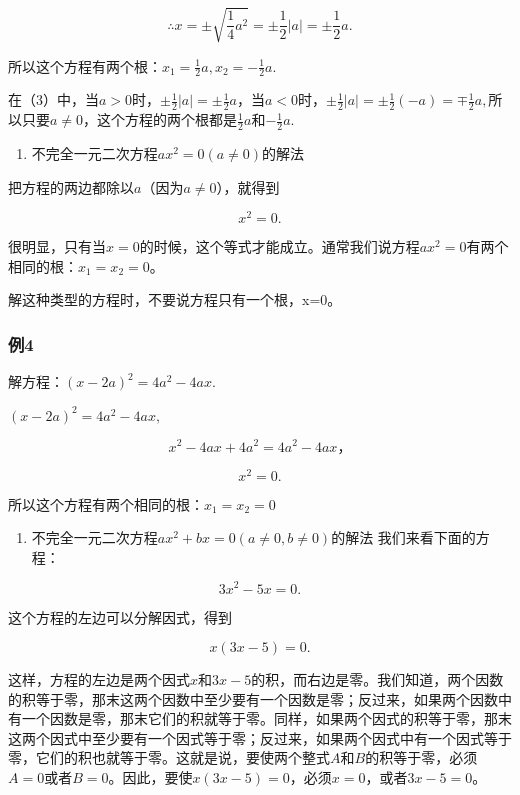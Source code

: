 \[
\therefore x = \pm \sqrt {\frac{1}{4} a ^ {2}} = \pm \frac{1}{2} | a | = \pm \frac{1}{2} a.
\]

所以这个方程有两个根：\(x_{1} = \frac{1}{2} a, x_{2} = -\frac{1}{2} a.\)

在（3）中，当\(a > 0\)时，\(\pm \frac{1}{2} |a| = \pm \frac{1}{2} a\)，当\(a <   0\)时，\(\pm \frac{1}{2} |a| = \pm \frac{1}{2} (-a) = \mp \frac{1}{2} a,\)所以只要\(a\neq 0\)，这个方程的两个根都是\(\frac{1}{2} a\)和\(-\frac{1}{2} a.\)

\begin{enumerate}[start=2]
\item
  不完全一元二次方程\(ax^2 = 0 (a \neq 0)\)的解法
\end{enumerate}

把方程的两边都除以\(a\)（因为\(a \neq 0\)），就得到

\[
x ^ {2} = 0.
\]

很明显，只有当\(x = 0\)的时候，这个等式才能成立。通常我们说方程\(ax^2 = 0\)有两个相同的根：\(x_1 = x_2 = 0\)。

 解这种类型的方程时，不要说方程只有一个根，x=0。

\subsubsection{例4}

解方程：\((x - 2a)^{2} = 4a^{2} - 4ax.\)

 \((x - 2a)^{2} = 4a^{2} - 4ax,\)

\[
x ^ {2} - 4 a x + 4 a ^ {2} = 4 a ^ {2} - 4 a x\text{，}
\]

\[
x ^ {2} = 0.
\]

所以这个方程有两个相同的根：\(x_{1} = x_{2} = 0\)

\begin{enumerate}[start=3]
\item
  不完全一元二次方程\(ax^2 + bx = 0 (a \neq 0, b \neq 0)\)的解法
  我们来看下面的方程：
\end{enumerate}

\[
3 x ^ {2} - 5 x = 0.
\]

这个方程的左边可以分解因式，得到

\[
x (3 x - 5) = 0.
\]

这样，方程的左边是两个因式\(x\)和\(3x - 5\)的积，而右边是零。我们知道，两个因数的积等于零，那末这两个因数中至少要有一个因数是零；反过来，如果两个因数中有一个因数是零，那末它们的积就等于零。同样，如果两个因式的积等于零，那末这两个因式中至少要有一个因式等于零；反过来，如果两个因式中有一个因式等于零，它们的积也就等于零。这就是说，要使两个整式\(A\)和\(B\)的积等于零，必须\(A = 0\)或者\(B = 0\)。因此，要使\(x(3x - 5) = 0\)，必须\(x = 0\)，或者\(3x - 5 = 0\)。

